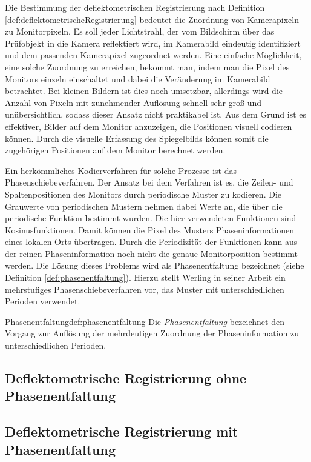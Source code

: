 Die Bestimmung der deflektometrischen Registrierung nach Definition \ref{def:deflektometrischeRegistrierung} bedeutet die Zuordnung von Kamerapixeln zu Monitorpixeln.
Es soll jeder Lichtstrahl, der vom Bildschirm über das Prüfobjekt in die Kamera reflektiert wird, im Kamerabild eindeutig identifiziert und dem passenden Kamerapixel zugeordnet werden.
Eine einfache Möglichkeit, eine solche Zuordnung zu erreichen, bekommt man, indem man die Pixel des Monitors einzeln einschaltet und dabei die Veränderung im Kamerabild betrachtet.
Bei kleinen Bildern ist dies noch umsetzbar, allerdings wird die Anzahl von Pixeln mit zunehmender Auflösung schnell sehr groß und unübersichtlich, sodass dieser Ansatz nicht praktikabel ist.
Aus dem Grund ist es effektiver, Bilder auf dem Monitor anzuzeigen, die Positionen visuell codieren können.
Durch die visuelle Erfassung des Spiegelbilds können somit die zugehörigen Positionen auf dem Monitor berechnet werden.

\p
Ein herkömmliches Kodierverfahren für solche Prozesse ist das Phasenschiebeverfahren.
Der Ansatz bei dem Verfahren ist es, die Zeilen- und Spaltenpositionen des Monitors durch periodische Muster zu kodieren.
Die Grauwerte von periodischen Mustern nehmen dabei Werte an, die über die periodische Funktion bestimmt wurden.
Die hier verwendeten Funktionen sind Kosinusfunktionen.
Damit können die Pixel des Musters Phaseninformationen eines lokalen Orts übertragen.
Durch die Periodizität der Funktionen kann aus der reinen Phaseninformation noch nicht die genaue Monitorposition bestimmt werden.
Die Lösung dieses Problems wird als Phasenentfaltung bezeichnet (siehe Definition \ref{def:phasenentfaltung}).
Hierzu stellt Werling in seiner Arbeit \cite{kit_werling} ein mehrstufiges Phasenschiebeverfahren vor, das Muster mit unterschiedlichen Perioden verwendet.

\begin{Definition}{Phasenentfaltung}{def:phasenentfaltung}
	Die \textit{Phasenentfaltung} bezeichnet den Vorgang zur Auflösung der mehrdeutigen Zuordnung der Phaseninformation zu unterschiedlichen Perioden.
\end{Definition}

{
	\FloatBarrier
    \subsection{Deflektometrische Registrierung ohne Phasenentfaltung}
    \label{sub:registrierungOhnePhasenentfaltung}
    
}

{
	\FloatBarrier
    \subsection{Deflektometrische Registrierung mit Phasenentfaltung}
    \label{sub:registrierungMitPhasenentfaltung}
    
}
